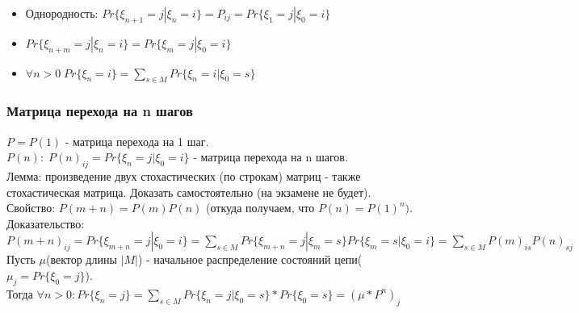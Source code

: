 \begin{itemize}
$Pr\{\xi_{n + k + 1} = j | \xi_0 = i_0, \; ... \; , \xi_n = i_n\} = \frac{Pr\{\xi_{n + k + 1} = j, \xi_0 = i_0, \; ... \; , \xi_n = i_n\}}{Pr\{\xi_0 = i_0, \; ... \; , \xi_n = i_n\}} = \sum\limits_{s \in M} \frac{Pr\{\xi_{n + k + 1} = j, \xi_{n + k} = s, \xi_0 = i_0, \; ... \; , \xi_n = i_n\}}{Pr\{\xi_0 = i_0, \; ... \; , \xi_n = i_n\}} = \sum\limits_{s \in M} \frac{P_{sj}Pr\{\xi_{n + k} = s, \xi_0 = i_0, \; ... \; , \xi_n = i_n\}}{Pr\{\xi_0 = i_0, \; ... \; , \xi_n = i_n\}} = \sum\limits_{s \in M} P_{sj}Pr\{\xi_{n + k} = s | \xi_0 = i_0, \; ... \; , \xi_n = i_n\} = \sum\limits_{s \in M} Pr\{\xi_{n + k + 1} = j | \xi_{n + k} = s\}Pr\{\xi_{n + k} = s | \xi_n = i_n\} = \sum\limits_{s \in M} \frac{Pr\{\xi_{n + k + 1} = j | \xi_{n + k} = s, \xi_{n} = i_n\}Pr\{\xi_{n + k} = s, \xi_n = i_n\}}{Pr\{\xi_n = i_n\}} = \sum\limits_{s \in M} \frac{Pr\{\xi_{n + k + 1} = j, \xi_{n + k} = s, \xi_n = i_n\}}{Pr\{\xi_n = i_n\}} = \sum\limits_{s \in M} \frac{Pr\{\xi_{n + k} = s | \xi_{n + k + 1} = j, \xi_n = i_n\}Pr\{\xi_{n + k + 1} = j, \xi_n = i_n\}}{Pr\{\xi_n = i_n\}} = \frac{Pr\{\xi_{n + k + 1} = j, \xi_n = i_n\}}{Pr\{\xi_n = i_n\}} \sum\limits_{s \in M} Pr\{\xi_{n + k} = s | \xi_{n + k + 1} = j, \xi_n = i_n\} = Pr\{\xi_{n + k + 1} = j | \xi_n = i_n\} * 1 = Pr\{\xi_{n + k + 1} = j | \xi_n = i_n\}$\\
\item Однородность: $Pr\{\xi_{n + 1} = j | \xi_n = i\} = P_{ij} = Pr\{\xi_1 = j | \xi_0 = i\}$\\
\item $Pr\{\xi_{n + m} = j | \xi_n = i\} = Pr\{\xi_m = j | \xi_0 = i\}$
\item $\forall n > 0 \; Pr\{\xi_n = i\} = \sum\limits_{s \in M} Pr\{\xi_n = i | \xi_0 = s\}$\\
\end{itemize}
\subsubsection{Матрица перехода на n шагов}
$P = P(1)$ - матрица перехода на 1 шаг.\\
$P(n): \; P(n)_{ij} = Pr\{\xi_n = j | \xi_0 = i\}$ - матрица перехода на n шагов.\\
Лемма: произведение двух стохастических (по строкам) матриц - также стохастическая матрица. Доказать самостоятельно (на экзамене не будет).\\
Свойство: $P(m + n) = P(m)P(n)$ (откуда получаем, что $P(n) = P(1)^n)$.\\
Доказательство: \\
$P(m + n)_{ij} = Pr\{\xi_{m + n} = j | \xi_0 = i\} = \sum\limits_{s \in M}Pr\{\xi_{m + n} = j | \xi_m = s\}Pr\{\xi_{m} = s | \xi_0 = i\} = \sum\limits_{s \in M} P(m)_{is}P(n)_{sj}$\\
Пусть $\mu$(вектор длины $|M|$) - начальное распределение состояний цепи($\mu_j = Pr\{\xi_0 = j\}$). \\
Тогда $\forall n > 0: Pr\{\xi_n = j\} = \sum\limits_{s \in M} Pr\{\xi_n = j | \xi_0 = s\} * Pr\{\xi_0 = s\} = (\mu * P^n)_j$\\
